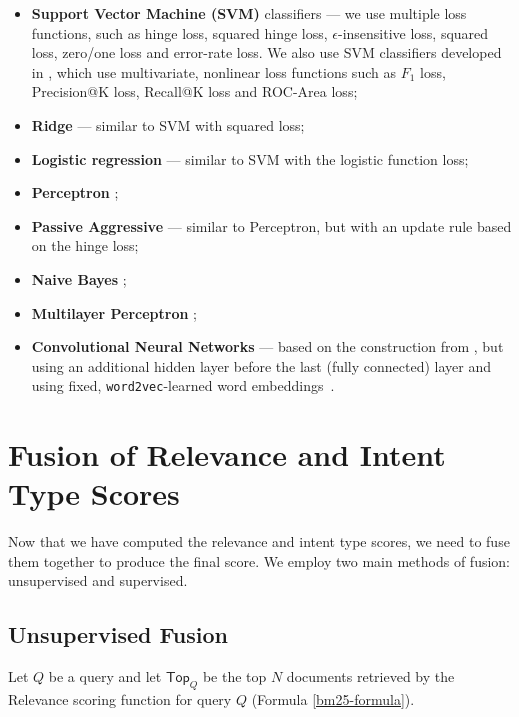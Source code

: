 \begin{itemize}
 \item \textbf{Support Vector Machine (SVM)} classifiers ---
we use multiple loss functions, such as hinge loss,
squared hinge loss, $\epsilon$-insensitive loss, squared loss, zero/one loss and error-rate loss.
We also use SVM classifiers developed in \cite{svmperf3, svmperf1, svmperf2}, which use multivariate,
nonlinear loss functions such as $F_1$ loss, Precision@K loss, Recall@K loss and ROC-Area loss;
\item \textbf{Ridge} \cite{scikit} --- similar to SVM with squared loss;
\item \textbf{Logistic regression} \cite{scikit} --- similar to SVM with the logistic function loss;
\item \textbf{Perceptron} \cite{scikit};
\item \textbf{Passive Aggressive} \cite{passiveAggr} --- similar to Perceptron, but with an update rule
  based on the hinge loss;
\item \textbf{Naive Bayes} \cite{ir-intro};
\item \textbf{Multilayer Perceptron} \cite{scikit};
\item \textbf{Convolutional Neural Networks} --- based on the construction from \cite{cnn}, but using an additional
hidden layer before the last (fully connected) layer and using fixed, \texttt{word2vec}-learned word embeddings~\cite{w2v}.
\end{itemize}

\section{Fusion of Relevance and Intent Type Scores}\label{fusion-theory}
Now that we have computed the relevance and intent type scores, we need to fuse them together to produce the final score.
We employ two main methods of fusion: unsupervised and supervised.

\subsection{Unsupervised Fusion}\label{unsup-fusion-theory}
Let $Q$ be a query and let $\textsf{Top}_Q$ be the top $N$ documents retrieved by the \textsf{Relevance}
scoring function for query $Q$ (Formula \ref{bm25-formula}).

